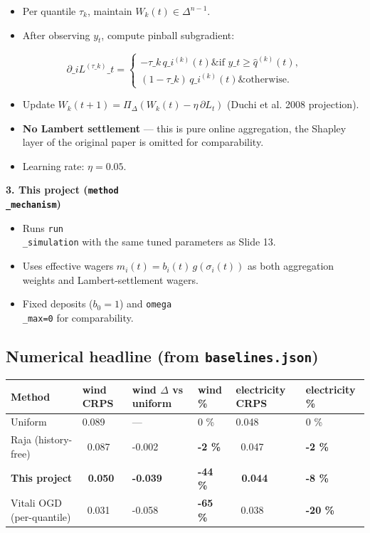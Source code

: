 \documentclass[11pt]{article}
\begin{document}
\begin{itemize}
\item Per quantile $\tau_k$, maintain $W_k(t) \in \Delta^{n-1}$.
\item After observing $y_t$, compute pinball subgradient:
\end{itemize}

$$
\partial\_i L^{(\tau\_k)}\_t = \begin{cases} -\tau\_k\, q\_i^{(k)}(t) \& \text{if } y\_t \ge \hat q^{(k)}(t), \\ (1 - \tau\_k)\, q\_i^{(k)}(t) \& \text{otherwise}. \end{cases}
$$

\begin{itemize}
\item Update $W_k(t+1) = \Pi_{\Delta}(W_k(t) - \eta\,\partial L_t)$ (Duchi et al. 2008 projection).
\item \textbf{No Lambert settlement} --- this is pure online aggregation, the Shapley layer of the original paper is omitted for comparability.
\item Learning rate: $\eta = 0.05$.
\end{itemize}

\textbf{3. This project (\texttt{method\\_mechanism})}

\begin{itemize}
\item Runs \texttt{run\\_simulation} with the same tuned parameters as Slide 13.
\item Uses effective wagers $m_i(t) = b_i(t)\,g(\sigma_i(t))$ as both aggregation weights and Lambert-settlement wagers.
\item Fixed deposits ($b_0 = 1$) and \texttt{omega\\_max=0} for comparability.
\end{itemize}

\subsection{Numerical headline (from \texttt{baselines.json})}


\begin{center}
\begin{tabular}{llllll}
\toprule
Method & wind CRPS & wind $\Delta$ vs uniform & wind \% & electricity CRPS & electricity \% \\
\midrule
Uniform & 0.089 & --- & 0 \% & 0.048 & 0 \% \\
Raja (history-free) & ~0.087 & -0.002 & \textbf{-2 \%} & ~0.047 & \textbf{-2 \%} \\
\textbf{This project} & \textbf{~0.050} & \textbf{-0.039} & \textbf{-44 \%} & \textbf{~0.044} & \textbf{-8 \%} \\
Vitali OGD (per-quantile) & ~0.031 & -0.058 & \textbf{-65 \%} & ~0.038 & \textbf{-20 \%} \\
\bottomrule
\end{tabular}
\end{center}
\end{document}
